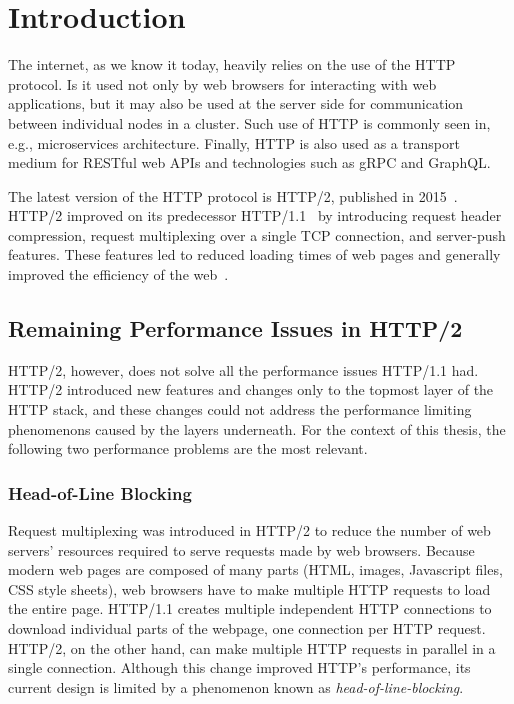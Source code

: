 \chapter{Introduction}

The internet, as we know it today, heavily relies on the use of the HTTP protocol. Is it used not
only by web browsers for interacting with web applications, but it may also be used at the server
side for communication between individual nodes in a cluster. Such use of HTTP is commonly seen in,
e.g., microservices architecture. Finally, HTTP is also used as a transport medium for RESTful web
APIs and technologies such as gRPC and GraphQL\@.

The latest version of the HTTP protocol is HTTP/2, published in 2015~\cite{rfc7540}. HTTP/2 improved
on its predecessor HTTP/1.1~\cite{rfc7230} by introducing request header compression, request
multiplexing over a single TCP connection, and server-push features. These features led to reduced
loading times of web pages and generally improved the efficiency of the web~\cite{deSaxce2015}.

\section{Remaining Performance Issues in HTTP/2}

HTTP/2, however, does not solve all the performance issues HTTP/1.1 had. HTTP/2 introduced new
features and changes only to the topmost layer of the HTTP stack, and these changes could not
address the performance limiting phenomenons caused by the layers underneath. For the context of
this thesis, the following two performance problems are the most relevant.

\subsection*{Head-of-Line Blocking}

Request multiplexing was introduced in HTTP/2 to reduce the number of web servers' resources
required to serve requests made by web browsers. Because modern web pages are composed of many parts
(HTML, images, Javascript files, CSS style sheets), web browsers have to make multiple HTTP requests
to load the entire page. HTTP/1.1 creates multiple independent HTTP connections to download
individual parts of the webpage, one connection per HTTP request. HTTP/2, on the other hand, can
make multiple HTTP requests in parallel in a single connection. Although this change improved HTTP's
performance, its current design is limited by a phenomenon known as
\textit{\gls{head-of-line-blocking}}.

